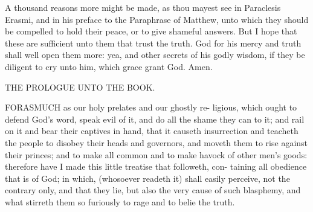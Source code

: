 \documentclass{custom}
\begin{document}
A thousand reasons more might be made, as 
thou mayest see in Paraclesis Erasmi, and in his 
preface to the Paraphrase of Matthew, unto 
which they should be compelled to hold their 
peace, or to give shameful answers. But I hope 
that these are sufficient unto them that trust the 
truth. God for his mercy and truth shall well open 
them more: yea, and other secrets of his godly 
wisdom, if they be diligent to cry unto him, 
which grace grant God. Amen. 


THE PROLOGUE 
UNTO THE BOOK. 

FORASMUCH as our holy prelates and our ghostly re- 
ligious, which ought to defend God's word, speak evil 
of it, and do all the shame they can to it; and rail on it and 
bear their captives in hand, that it causeth insurrection and 
teacheth the people to disobey their heads and governors, 
and moveth them to rise against their princes; and to make 
all common and to make havock of other men's goods:
therefore have I made this little treatise that followeth, con- 
taining all obedience that is of God; in which, (whosoever 
readeth it) shall easily perceive, not the contrary only, and 
that they lie, but also the very cause of such blasphemy, 
and what stirreth them so furiously to rage and to belie the 
truth. 
\end{document}
